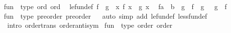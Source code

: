 \begin{isabellebody}
{}
\isamarkuptrue%
%
\endisatagdocument
{\isafolddocument}%
%
\isadelimdocument
%
\endisadelimdocument
{}\isamarkupfalse%
\ {\isachardoublequoteopen}fun{\isachardoublequoteclose}\ {\isacharcolon}{\kern0pt}{\isacharcolon}{\kern0pt}\ {\isacharparenleft}{\kern0pt}type{\isacharcomma}{\kern0pt}\ ord{\isacharparenright}{\kern0pt}\ ord\isanewline
{}\isanewline
\isanewline
{}\isamarkupfalse%
\isanewline
\ \ le{\isacharunderscore}{\kern0pt}fun{\isacharunderscore}{\kern0pt}def{\isacharcolon}{\kern0pt}\ {\isachardoublequoteopen}f\ {\isasymle}\ g\ {\isasymlongleftrightarrow}\ {\isacharparenleft}{\kern0pt}{\isasymforall}x{\isachardot}{\kern0pt}\ f\ x\ {\isasymle}\ g\ x{\isacharparenright}{\kern0pt}{\isachardoublequoteclose}\isanewline
\isanewline
{}\isamarkupfalse%
\isanewline
\ \ {\isachardoublequoteopen}{\isacharparenleft}{\kern0pt}f{\isacharcolon}{\kern0pt}{\isacharcolon}{\kern0pt}{\isacharprime}{\kern0pt}a\ {\isasymRightarrow}\ {\isacharprime}{\kern0pt}b{\isacharparenright}{\kern0pt}\ {\isacharless}{\kern0pt}\ g\ {\isasymlongleftrightarrow}\ f\ {\isasymle}\ g\ {\isasymand}\ {\isasymnot}\ {\isacharparenleft}{\kern0pt}g\ {\isasymle}\ f{\isacharparenright}{\kern0pt}{\isachardoublequoteclose}\isanewline
\isanewline
{}\isamarkupfalse%
%
\isadelimproof
\ %
\endisadelimproof
%
\isatagproof
\isacommand{{\isachardot}{\kern0pt}{\isachardot}{\kern0pt}}\isamarkupfalse%
%
\endisatagproof
{\isafoldproof}%
%
\isadelimproof
%
\endisadelimproof
\isanewline
\isanewline
{}\isamarkupfalse%
\isanewline
\isanewline
{}\isamarkupfalse%
\ {\isachardoublequoteopen}fun{\isachardoublequoteclose}\ {\isacharcolon}{\kern0pt}{\isacharcolon}{\kern0pt}\ {\isacharparenleft}{\kern0pt}type{\isacharcomma}{\kern0pt}\ preorder{\isacharparenright}{\kern0pt}\ preorder%
\isadelimproof
\ %
\endisadelimproof
%
\isatagproof
{}\isamarkupfalse%
\isanewline
{}\isamarkupfalse%
\ {\isacharparenleft}{\kern0pt}auto\ simp\ add{\isacharcolon}{\kern0pt}\ le{\isacharunderscore}{\kern0pt}fun{\isacharunderscore}{\kern0pt}def\ less{\isacharunderscore}{\kern0pt}fun{\isacharunderscore}{\kern0pt}def\isanewline
\ \ intro{\isacharcolon}{\kern0pt}\ order{\isacharunderscore}{\kern0pt}trans\ order{\isachardot}{\kern0pt}antisym{\isacharparenright}{\kern0pt}%
\endisatagproof
{\isafoldproof}%
%
\isadelimproof
%
\endisadelimproof
\isanewline
\isanewline
{}\isamarkupfalse%
\ {\isachardoublequoteopen}fun{\isachardoublequoteclose}\ {\isacharcolon}{\kern0pt}{\isacharcolon}{\kern0pt}\ {\isacharparenleft}{\kern0pt}type{\isacharcomma}{\kern0pt}\ order{\isacharparenright}{\kern0pt}\ order%

\end{isabellebody}
